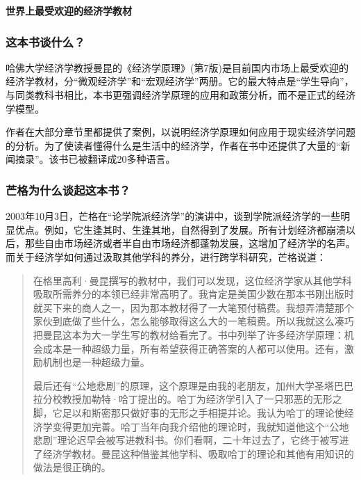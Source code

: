 \cleardoublepage
{}


\begin{BookSummaryBox}
\textbf{世界上最受欢迎的经济学教材}
\par
\end{BookSummaryBox}

\subsubsection*{这本书谈什么？}

哈佛大学经济学教授曼昆的《经济学原理》(第7版)是目前国内市场上最受欢迎的经济学教材，分“微观经济学”和“宏观经济学”两册。它的最大特点是“学生导向”，与同类教科书相比，本书更强调经济学原理的应用和政策分析，而不是正式的经济学模型。
\par

作者在大部分章节里都提供了案例，以说明经济学原理如何应用于现实经济学问题的分析。为了使读者懂得什么是生活中的经济学，作者在书中还提供了大量的“新闻摘录”。该书已被翻译成20多种语言。
\par

\subsubsection*{芒格为什么谈起这本书？}

2003年10月3日，芒格在“论学院派经济学”的演讲中，谈到学院派经济学的一些明显优点。例如，它生逢其时、生逢其地，自然得到了发展。所有计划经济都崩溃以后，那些自由市场经济或者半自由市场经济都蓬勃发展，这增加了经济学的名声。而关于经济学如何通过汲取其他学科的养分，进行跨学科研究，芒格说道：
\par

\begin{quotation}
在格里高利·曼昆撰写的教材中，我们可以发现，这位经济学家从其他学科吸取所需养分的本领已经非常高明了。我肯定是美国少数在那本书刚出版时就买下来的商人之一，因为那本教材得了一大笔预付稿费。我想弄清楚那个家伙到底做了些什么，怎么能够取得这么大的一笔稿费。所以我就这么凑巧把曼昆这本为大一学生写的教材给看完了。书中列举了许多经济学原理：机会成本是一种超级力量，所有希望获得正确答案的人都可以使用。还有，激励机制也是一种超级力量。
\par

最后还有“公地悲剧”的原理，这个原理是由我的老朋友，加州大学圣塔巴巴拉分校教授加勒特·哈丁提出的。哈丁为经济学引入了一只邪恶的无形之脚，它足以和斯密那只做好事的无形之手相提并论。我认为哈丁的理论使经济学变得更加完善。哈丁当年向我介绍他的理论时，我就知道他这个“公地悲剧”理论迟早会被写进教科书。你们看啊，二十年过去了，它终于被写进了经济学教材。曼昆这种借鉴其他学科、吸取哈丁的理论和其他有用知识的做法是很正确的。
\par
\end{quotation}

